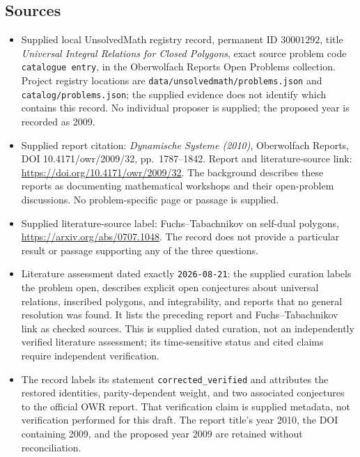 \documentclass[11pt]{article}
\begin{document}
\subsection{Sources}
\begin{itemize}
\item Supplied local UnsolvedMath registry record, permanent ID \(30001292\), title \emph{Universal Integral Relations for Closed Polygons}, exact source problem code \texttt{catalogue entry}, in the Oberwolfach Reports Open Problems collection. Project registry locations are \texttt{data/unsolvedmath/problems.json} and \texttt{catalog/problems.json}; the supplied evidence does not identify which contains this record. No individual proposer is supplied; the proposed year is recorded as 2009.
\item Supplied report citation: \emph{Dynamische Systeme (2010)}, Oberwolfach Reports, DOI 10.4171/owr/2009/32, pp.\ 1787--1842. Report and literature-source link: \url{https://doi.org/10.4171/owr/2009/32}. The background describes these reports as documenting mathematical workshops and their open-problem discussions. No problem-specific page or passage is supplied.
\item Supplied literature-source label: Fuchs--Tabachnikov on self-dual polygons, \url{https://arxiv.org/abs/0707.1048}. The record does not provide a particular result or passage supporting any of the three questions.
\item Literature assessment dated exactly \texttt{2026-08-21}: the supplied curation labels the problem open, describes explicit open conjectures about universal relations, inscribed polygons, and integrability, and reports that no general resolution was found. It lists the preceding report and Fuchs--Tabachnikov link as checked sources. This is supplied dated curation, not an independently verified literature assessment; its time-sensitive status and cited claims require independent verification.
\item The record labels its statement \texttt{corrected\_verified} and attributes the restored identities, parity-dependent weight, and two associated conjectures to the official OWR report. That verification claim is supplied metadata, not verification performed for this draft. The report title's year 2010, the DOI containing 2009, and the proposed year 2009 are retained without reconciliation.
\end{itemize}
\end{document}
